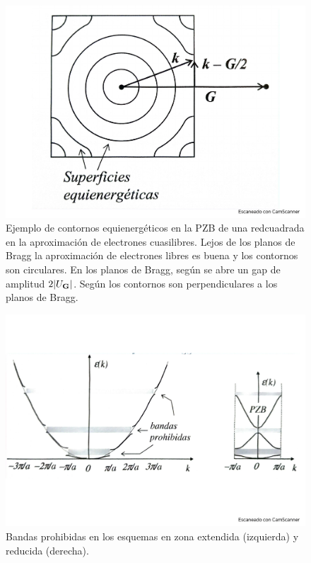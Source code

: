 \begin{figure}[h!] \centering
    \includegraphics[scale=0.35]{Cuerpo/Ch_07/Fotos libro 3.pdf}
    \caption{Ejemplo de contornos equienergéticos en la PZB de una redcuadrada en la aproximación de electrones cuasilibres. Lejos de los planos de Bragg la aproximación de electrones libres es buena y los contornos son circulares. En los planos de Bragg, según se abre un gap de amplitud $2|U_{\mathbf{G}}|$. Según los contornos son perpendiculares a los planos de Bragg.}
    \label{Fig:07-03}
\end{figure}    

\begin{figure}[h!] \centering
    \includegraphics[scale=0.35]{Cuerpo/Ch_07/Fotos libro 4.pdf}
    \caption{Bandas prohibidas en los esquemas en zona extendida (izquierda) y reducida (derecha).}
    \label{Fig:07-04}
\end{figure}    

